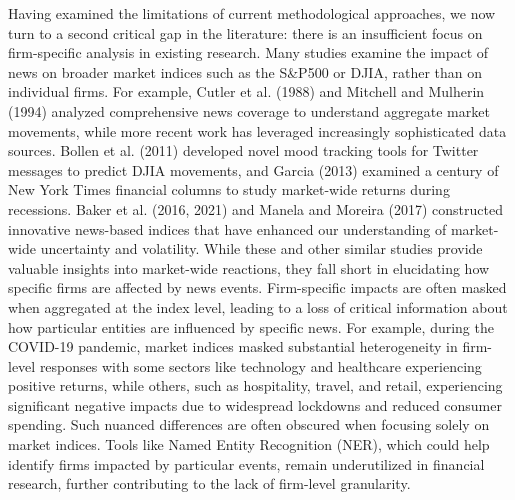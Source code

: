 \mx
Having examined the limitations of current methodological approaches, we now turn to a second critical gap in the literature: there is an insufficient focus on firm-specific analysis in existing research. Many studies examine the impact of news on broader market indices
 such as the S\&P500 or DJIA, rather than on individual firms. 
For example, Cutler et al. (1988) and Mitchell and Mulherin (1994) analyzed comprehensive news coverage to understand aggregate market movements, while more recent work has leveraged increasingly sophisticated data sources. Bollen et al. (2011) developed novel mood tracking tools for Twitter messages to predict DJIA movements, and Garcia (2013) examined a century of New York Times financial columns to study market-wide returns during recessions. Baker et al. (2016, 2021) and Manela and Moreira (2017) constructed innovative news-based indices that have enhanced our understanding of market-wide uncertainty and volatility.
While these and other similar studies provide valuable insights into market-wide reactions, they fall short in elucidating how specific firms are affected by news events. Firm-specific impacts are often masked when aggregated at the index level, leading to a loss of critical information about how particular entities are influenced by specific news. 
For example, during the COVID-19 pandemic, market indices masked substantial heterogeneity in firm-level responses
 with some sectors like technology and healthcare experiencing positive returns, while others, such as hospitality, travel, and retail, experiencing significant negative impacts due to widespread lockdowns and reduced consumer spending. 
Such nuanced differences are often obscured when focusing solely on market indices. Tools like Named Entity Recognition (NER), which could help identify firms impacted by particular events, remain underutilized in financial research, further contributing to the lack of firm-level granularity.


